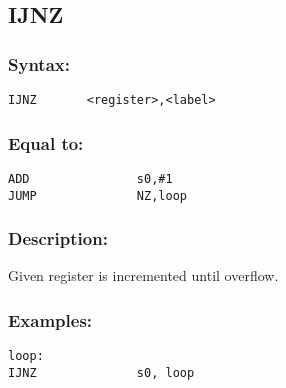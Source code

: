     \subsection{IJNZ}
        \subsubsection{Syntax:}
            \verb'IJNZ       <register>,<label>'

        \subsubsection{Equal to:}
        {
            \usecodefont
            \verb'ADD               s0,#1'\\
            \verb'JUMP              NZ,loop'\\
        }

        \subsubsection{Description:}
            Given register is incremented until overflow.

        \subsubsection{Examples:}
        {
            \usecodefont
            \verb'loop:             '\\
            \verb'IJNZ              s0, loop'\\
        }

